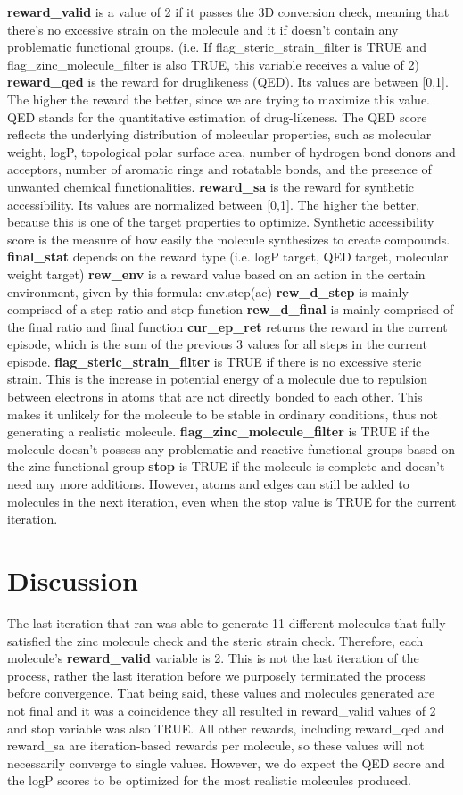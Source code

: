 \documentclass{article}
\begin{document}
\textbf{reward_valid} is a value of 2 if it passes the 3D conversion check, meaning that there’s no excessive strain on the molecule and it if doesn’t contain any problematic functional groups. (i.e. If flag_steric_strain_filter is TRUE and flag_zinc_molecule_filter is also TRUE, this variable receives a value of 2)
\textbf{reward_qed} is the reward for druglikeness (QED). Its values are between [0,1]. The higher the reward the better, since we are trying to maximize this value. QED stands for the quantitative estimation of drug-likeness. The QED score reflects the underlying distribution of molecular properties, such as molecular weight, logP, topological polar surface area, number of hydrogen bond donors and acceptors, number of aromatic rings and rotatable bonds, and the presence of unwanted chemical functionalities.
\textbf{reward_sa} is the reward for synthetic accessibility. Its values are normalized between [0,1]. The higher the better, because this is one of the target properties to optimize. Synthetic accessibility score is the measure of how easily the molecule synthesizes to create compounds. 
\textbf{final_stat} depends on the reward type (i.e. logP target, QED target, molecular weight target)
\textbf{rew_env} is a reward value based on an action in the certain environment, given by this formula: env.step(ac)
\textbf{rew_d_step} is mainly comprised of a step ratio and step function
\textbf{rew_d_final} is mainly comprised of the final ratio and final function
\textbf{cur_ep_ret} returns the reward in the current episode, which is the sum of the previous 3 values for all steps in the current episode.
\textbf{flag_steric_strain_filter} is TRUE if there is no excessive steric strain. This is the increase in potential energy of a molecule due to repulsion between electrons in atoms that are not directly bonded to each other. This makes it unlikely for the molecule to be stable in ordinary conditions, thus not generating a realistic molecule.
\textbf{flag_zinc_molecule_filter} is TRUE if the molecule doesn’t possess any problematic and reactive functional groups based on the zinc functional group
\textbf{stop} is TRUE if the molecule is complete and doesn’t need any more additions. However, atoms and edges can still be added to molecules in the next iteration, even when the stop value is TRUE for the current iteration.


\section{Discussion}
The last iteration that ran was able to generate 11 different molecules that fully satisfied the zinc molecule check and the steric strain check. Therefore, each molecule’s \textbf{reward_valid} variable is 2. This is not the last iteration of the process, rather the last iteration before we purposely terminated the process before convergence. That being said, these values and molecules generated are not final and it was a coincidence they all resulted in reward_valid values of 2 and stop variable was also TRUE. All other rewards, including reward_qed and reward_sa are iteration-based rewards per molecule, so these values will not necessarily converge to single values. However, we do expect the QED score and the logP scores to be optimized for the most realistic molecules produced.
\end{document}
